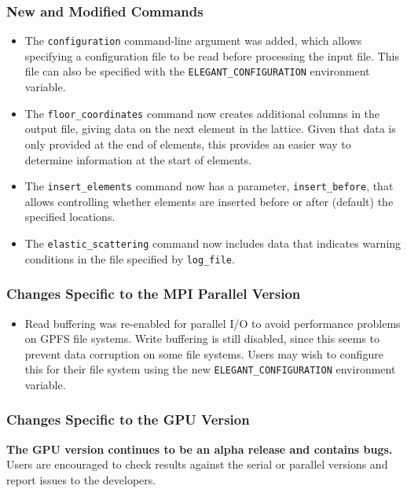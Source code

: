 \documentclass[11pt]{article}
\begin{document}
\subsubsection{New and Modified Commands}
\begin{itemize}
\item The \verb|configuration| command-line argument was added, which allows specifying a configuration file
  to be read before processing the input file. This file can also be specified with the \verb|ELEGANT_CONFIGURATION|
  environment variable.
\item The \verb|floor_coordinates| command now creates additional columns in the output file, giving data on
  the next element in the lattice. Given that data is only provided at the end of elements, this provides
  an easier way to determine information at the start of elements.
\item The \verb|insert_elements| command now has a parameter, \verb|insert_before|, that allows controlling whether
  elements are inserted before or after (default) the specified locations.
\item The \verb|elastic_scattering| command now includes data that indicates warning conditions in the file
  specified by \verb|log_file|.
\end{itemize}

\subsubsection{Changes Specific to the MPI Parallel Version}

\begin{itemize}
\item Read buffering was re-enabled for parallel I/O to avoid performance problems on GPFS file systems.
  Write buffering is still disabled, since this seems to prevent data corruption on some file systems.
  Users may wish to configure this for their file system using the new \verb|ELEGANT_CONFIGURATION| 
  environment variable.
\end{itemize}

\subsubsection{Changes Specific to the GPU Version}

{\bf The GPU version continues to be an alpha release and contains bugs.}
Users are encouraged to check results against the serial or parallel versions and report issues to the developers.
\end{document}
